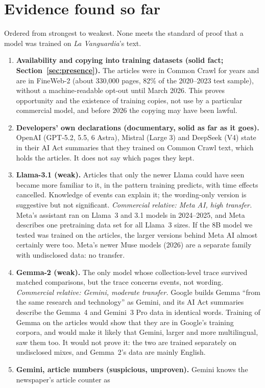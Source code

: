 \documentclass[10pt,a4paper]{article}
\begin{document}
\section{Evidence found so far}\label{sec:evidence}
Ordered from strongest to weakest. None meets the standard of proof that a model was trained on \emph{La Vanguardia}'s
text.
\begin{enumerate}
\item \textbf{Availability and copying into training datasets (solid fact; Section~\ref{sec:presence}).} The
articles were in Common Crawl for years and are in FineWeb-2 (about 330,000 pages, 82\% of the 2020--2023 test sample),
without a machine-readable opt-out until March 2026. This proves opportunity and the existence of training copies,
not use by a particular commercial model, and before 2026 the copying may have been lawful.
\item \textbf{Developers' own declarations (documentary, solid as far as it goes).} OpenAI (GPT-5.2, 5.5, 6 Astra),
Mistral (Large 3) and DeepSeek (V4) state in their AI Act summaries that they trained on Common Crawl text, which holds
the articles. It does not say which pages they kept.
\item \textbf{Llama-3.1 (weak).} Articles that only the newer Llama could have seen became more familiar to it, in
the pattern training predicts, with time effects cancelled. Knowledge of events can explain it; the wording-only
version is suggestive but not significant.
\emph{Commercial relative: Meta AI, high transfer.} Meta's assistant ran on Llama~3 and 3.1 models in 2024--2025,
and Meta describes one pretraining data set for all Llama~3 sizes. If the 8B model we tested was trained on the
articles, the larger versions behind Meta AI almost certainly were too. Meta's newer Muse models (2026) are a separate
family with undisclosed data: no transfer.
\item \textbf{Gemma-2 (weak).} The only model whose collection-level trace survived matched comparisons, but the
trace concerns events, not wording.
\emph{Commercial relative: Gemini, moderate transfer.} Google builds Gemma ``from the same research and technology''
as Gemini, and its AI Act summaries describe the Gemma~4 and Gemini~3 Pro data in identical words. Training of Gemma
on the articles would show that they are in Google's training corpora, and would make it likely that Gemini, larger
and more multilingual, saw them too. It would not prove it: the two are trained separately on undisclosed mixes, and
Gemma~2's data are mainly English.
\item \textbf{Gemini, article numbers (suspicious, unproven).} Gemini knows the newspaper's article counter as

\end{enumerate}
\end{document}
